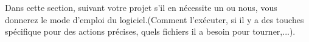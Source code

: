Dans cette section, suivant votre projet s'il en nécessite un ou nous, vous donnerez le mode d'emploi du logiciel.(Comment l'exécuter, si il y a des touches spécifique pour des actions précises, quels fichiers il a besoin pour tourner,...).